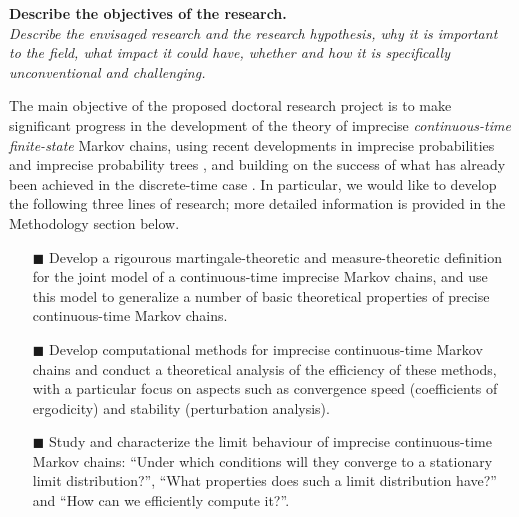 \documentclass[11pt,dvipsnames,usenames,a4paper]{article}
\begin{document}
\vspace{3mm}

\textbf{Describe the objectives of the research.}\\
\textit{Describe the envisaged research and the research hypothesis, why it is important to the field, what impact it could have, whether and how it is specifically unconventional and challenging.}


The main objective of the proposed doctoral research project is to make significant progress in the development of the theory of imprecise \emph{continuous-time} \emph{finite-state} Markov chains, using recent developments in imprecise probabilities \cite{augustin2013:itip,troffaes2013:lp} and imprecise probability trees \cite{shafer2001,cooman2007d}, and building on the success of what has already been achieved in the discrete-time case \cite{cooman2008,hermans2012,skulj2013,cooman2015:markovergodic}. In particular, we would like to develop the following three lines of research; more detailed information is provided in the Methodology section below.

\vspace{6pt}
\begin{itemize}
\item[\tiny$\blacksquare$]
Develop a rigourous martingale-theoretic and measure-theoretic definition for the joint model of a continuous-time imprecise Markov chains, and use this model to generalize a number of basic theoretical properties of precise continuous-time Markov chains.
\item[\tiny$\blacksquare$]
Develop computational methods for imprecise continuous-time Markov chains and conduct a theoretical analysis of the efficiency of these methods, with a particular focus on aspects such as convergence speed (coefficients of ergodicity) and stability (perturbation analysis).
\item[\tiny$\blacksquare$]
Study and characterize the limit behaviour of imprecise continuous-time Markov chains: ``Under which conditions will they converge to a stationary limit distribution?'', ``What properties does such a limit distribution have?'' and ``How can we efficiently compute it?''. 
\end{itemize}
\vspace{6pt}
\end{document}
